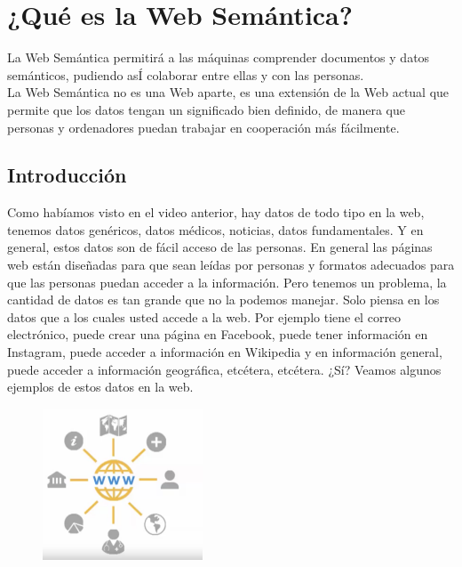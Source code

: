
\section{¿Qué es la Web Semántica?}



La Web Semántica permitirá a las máquinas comprender documentos y datos semánticos, pudiendo asÍ colaborar entre ellas y con las personas.\\

La Web Semántica no es una Web aparte, es una extensión de la Web actual que permite que los datos tengan un significado bien definido, de manera que personas y ordenadores puedan trabajar en cooperación más fácilmente.


\subsection{Introducción}


Como habíamos visto en el video anterior, hay datos de todo tipo en la web, tenemos datos genéricos, datos médicos, noticias, datos fundamentales. Y en general, estos datos son de fácil acceso de las personas. En general las páginas web están diseñadas para que sean leídas por personas y formatos adecuados para que las personas puedan acceder a la información. Pero tenemos un problema, la cantidad de datos es tan grande que no la podemos manejar. Solo piensa en los datos que a los cuales usted accede a la web. Por ejemplo tiene el correo electrónico, puede crear una página en Facebook, puede tener información en Instagram, puede acceder a información en Wikipedia y en información general, puede acceder a información geográfica, etcétera, etcétera. ¿Sí? Veamos algunos ejemplos de estos datos en la web. 

\begin{figure}[H]
	\centering
	\includegraphics[height=4.5cm]{imagenes/capitulo3/4}
	\caption{}
\end{figure}

